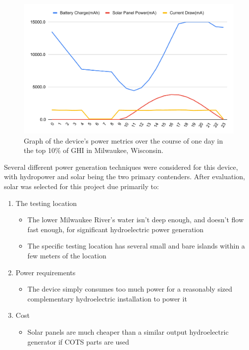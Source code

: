 \documentclass[fleqn,10pt]{SelfArx} %
\begin{document}
		\begin{figure}[h]
		\centering
		\includegraphics[width=1\linewidth]{Figures/HiDay}
		\caption[Power Consumption Graph]{Graph of the device's power metrics over the course of one day in the top 10\% of GHI in Milwaukee, Wisconsin.}
		\label{fig:topPowerGen}
	\end{figure} 
	Several different power generation techniques were considered for this device, with hydropower and solar being the two primary contenders. After evaluation, solar was selected for this project due primarily to:
	\begin{enumerate}
		\item The testing location
		\begin{itemize}
			\item The lower Milwaukee River's water isn't deep enough, and doesn't flow fast enough, for significant hydroelectric power generation
			\item The specific testing location has several small and bare islands within a few meters of the location
		\end{itemize}
		\item Power requirements
			\begin{itemize}
				\item The device simply consumes too much power for a reasonably sized complementary hydroelectric installation to power it
			\end{itemize}
		\item Cost
		\begin{itemize}
			\item Solar panels are much cheaper than a similar output hydroelectric generator if COTS parts are used
		\end{itemize}
	\end{enumerate}
	
\end{document}
